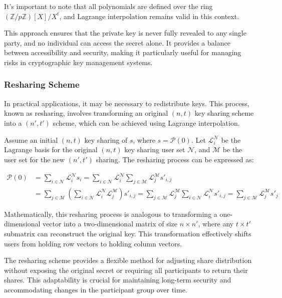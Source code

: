 \documentclass[11pt]{article}
\begin{document}
It's important to note that all polynomials are defined over the ring $(\mathbb{Z}/p\mathbb{Z})[X]/X^{t}$, and Lagrange interpolation remains valid in this context.

This approach ensures that the private key is never fully revealed to any single party, and no individual can access the secret alone. It provides a balance between accessibility and security, making it particularly useful for managing risks in cryptographic key management systems.

\subsubsection{Resharing Scheme}
\label{sec:resharing}

In practical applications, it may be necessary to redistribute keys. This process, known as resharing, involves transforming an original $(n,t)$ key sharing scheme into a $(n',t')$ scheme, which can be achieved using Lagrange interpolation.

Assume an initial $(n,t)$ key sharing of $s$, where $s=\mathcal{P}(0)$. Let $\mathcal{L}^\mathcal{N}_i$ be the Lagrange basis for the original $(n,t)$ key sharing user set $\mathcal{N}$, and $\mathcal{M}$ be the user set for the new $(n',t')$ sharing. The resharing process can be expressed as:

\begin{equation}
\begin{aligned}
\mathcal{P}(0)&=\sum_{i\in\mathcal{N}}\mathcal{L}^\mathcal{N}_is_i=\sum_{i\in\mathcal{N}}\mathcal{L}^\mathcal{N}_i\sum_{j\in\mathcal{M}}\mathcal{L}^\mathcal{M}_js'_{i,j}\\
&=\sum_{j\in\mathcal{M}}\left(\sum_{i\in\mathcal{N}}\mathcal{L}^\mathcal{N}_i\mathcal{L}^\mathcal{M}_j\right)s'_{i,j}
=\sum_{j\in\mathcal{M}}\mathcal{L}^\mathcal{M}_j\sum_{i\in\mathcal{N}}\mathcal{L}^\mathcal{N}_is'_{i,j}=\sum_{j\in\mathcal{M}}\mathcal{L}^\mathcal{M}_js'_j
\end{aligned}
\end{equation}

Mathematically, this resharing process is analogous to transforming a one-dimensional vector into a two-dimensional matrix of size $n \times n'$, where any $t \times t'$ submatrix can reconstruct the original key. This transformation effectively shifts users from holding row vectors to holding column vectors.

The resharing scheme provides a flexible method for adjusting share distribution without exposing the original secret or requiring all participants to return their shares. This adaptability is crucial for maintaining long-term security and accommodating changes in the participant group over time.
\end{document}
